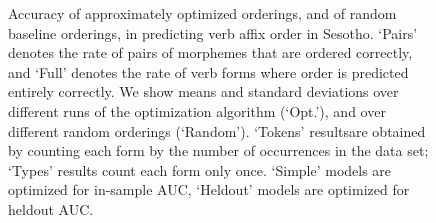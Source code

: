 \documentclass[11pt,letterpaper]{article}
\begin{document}
\begin{figure}
\begin{tabular}{cccc||ll|ll}
\end{tabular}
\caption{Accuracy of approximately optimized orderings, and of random baseline orderings, in predicting verb affix order in Sesotho. `Pairs' denotes the rate of pairs of morphemes that are ordered correctly, and `Full' denotes the rate of verb forms where order is predicted entirely correctly. We show means and standard deviations over different runs of the optimization algorithm (`Opt.'), and over different random orderings (`Random'). `Tokens' resultsare obtained by counting each form by the number of occurrences in the data set; `Types' results count each form only once. `Simple' models are optimized for in-sample AUC, `Heldout' models are optimized for heldout AUC.}\label{fig:acc-sesotho}
\end{figure}









\end{document}
